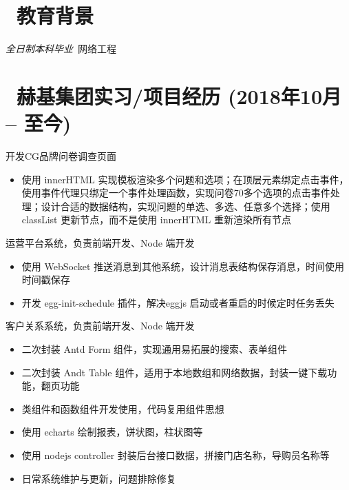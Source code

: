 \documentclass{resume}
\begin{document}


 
\section{\faGraduationCap\ 教育背景}
\textit{全日制本科毕业}\ 网络工程

\section{\faUsers\ 赫基集团实习/项目经历 (2018年10月 -- 至今)}

开发CG品牌问卷调查页面
\begin{itemize}
  \item 使用 innerHTML 实现模板渲染多个问题和选项；在顶层元素绑定点击事件，使用事件代理只绑定一个事件处理函数，实现问卷70多个选项的点击事件处理；设计合适的数据结构，实现问题的单选、多选、任意多个选择；使用 classList 更新节点，而不是使用 innerHTML 重新渲染所有节点
\end{itemize}

运营平台系统，负责前端开发、Node 端开发
\begin{itemize}
  \item 使用 WebSocket 推送消息到其他系统，设计消息表结构保存消息，时间使用时间戳保存
  \item 开发 egg-init-schedule 插件，解决eggjs 启动或者重启的时候定时任务丢失
\end{itemize}

客户关系系统，负责前端开发、Node 端开发
\begin{itemize}
  \item 二次封装 Antd Form 组件，实现通用易拓展的搜索、表单组件
  \item 二次封装 Andt Table 组件，适用于本地数组和网络数据，封装一键下载功能，翻页功能
  \item 类组件和函数组件开发使用，代码复用组件思想
  \item 使用 echarts 绘制报表，饼状图，柱状图等
  \item 使用 nodejs controller 封装后台接口数据，拼接门店名称，导购员名称等
  \item 日常系统维护与更新，问题排除修复
\end{itemize}
\end{document}
